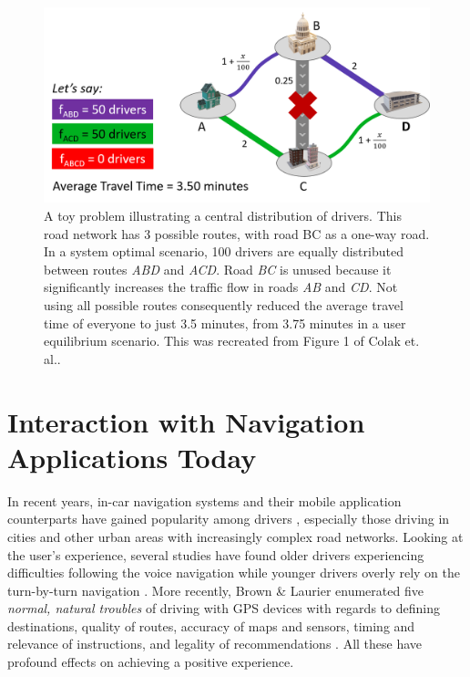 \begin{figure}[t]
  \centering
  \includegraphics[scale=0.6]{figures/system-optimal.png}
  \caption{A toy problem illustrating a central distribution of drivers. This road network has 3 possible routes, with road BC as a one-way road. In a system optimal scenario, 100 drivers are equally distributed between routes \textit{ABD} and \textit{ACD}. Road \textit{BC} is unused because it significantly increases the traffic flow in roads \textit{AB} and \textit{CD}. Not using all possible routes consequently reduced the average travel time of everyone to just 3.5 minutes, from 3.75 minutes in a user equilibrium scenario. This was recreated from Figure 1 of Colak et. al.\cite{colak2016understanding}.}
  \label{fig:system-optimal}
\end{figure}

\section{Interaction with Navigation Applications Today}
In recent years, in-car navigation systems and their mobile application counterparts have gained popularity among drivers \cite{2018GoogleAnnieb, Waze2016DriverIndex}, especially those driving in cities and other urban areas with increasingly complex road networks. Looking at the user's experience, several studies have found older drivers experiencing difficulties following the voice navigation \cite{Dingus1997a,Mahmud2009UserDrivers} while younger drivers overly rely on the turn-by-turn navigation \cite{Mahmud2009UserDrivers}. More recently, Brown \& Laurier enumerated five \emph{normal, natural troubles} of driving with GPS devices with regards to defining destinations, quality of routes, accuracy of maps and sensors, timing and relevance of instructions, and legality of recommendations \cite{Brown2012TheGPS}. All these have profound effects on achieving a positive experience.

